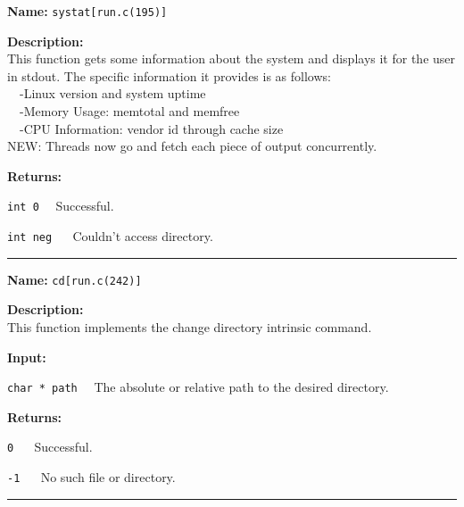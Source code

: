 \documentclass[11pt,a4paper]{article}
\begin{document}
\begin{description}
\item \textbf{Name:} 
\verb|systat[run.c(195)]|

\item \textbf{Description:}\\
This function gets some information about the system and displays it for the
user in stdout. The specific information it provides is as follows:\\
~~-Linux version and system uptime\\
~~-Memory Usage: memtotal and memfree\\
~~-CPU Information: vendor id through cache size\\
NEW: Threads now go and fetch each piece of output concurrently.

\item \textbf{Returns:}
\begin{description}
\item \verb|int 0|~~ Successful.
\item \verb|int neg| ~~ Couldn't access directory.
\end{description}
\end{description}\hrule

\begin{description}
\item \textbf{Name:} 
\verb|cd[run.c(242)]|

\item \textbf{Description:}\\
This function implements the change directory intrinsic command.

\item \textbf{Input:}
\begin{description}
\item \verb|char * path|~~ The absolute or relative path to the desired directory.
\end{description}

\item \textbf{Returns:}
\begin{description}
\item \verb|0| ~~ Successful.
\item \verb|-1| ~~ No such file or directory.
\end{description}
\end{description}\hrule
\end{document}
